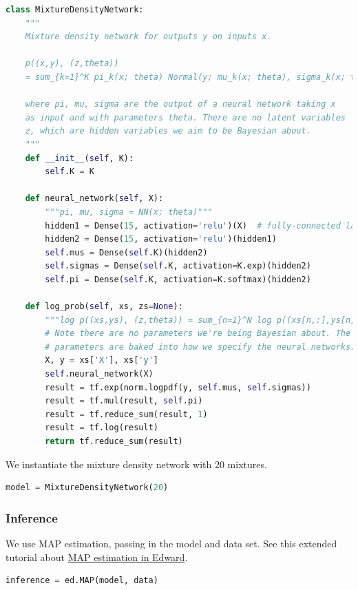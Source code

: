 \begin{lstlisting}[language=Python]
class MixtureDensityNetwork:
    """
    Mixture density network for outputs y on inputs x.

    p((x,y), (z,theta))
    = sum_{k=1}^K pi_k(x; theta) Normal(y; mu_k(x; theta), sigma_k(x; theta))

    where pi, mu, sigma are the output of a neural network taking x
    as input and with parameters theta. There are no latent variables
    z, which are hidden variables we aim to be Bayesian about.
    """
    def __init__(self, K):
        self.K = K

    def neural_network(self, X):
        """pi, mu, sigma = NN(x; theta)"""
        hidden1 = Dense(15, activation='relu')(X)  # fully-connected layer with 15 hidden units
        hidden2 = Dense(15, activation='relu')(hidden1)
        self.mus = Dense(self.K)(hidden2)
        self.sigmas = Dense(self.K, activation=K.exp)(hidden2)
        self.pi = Dense(self.K, activation=K.softmax)(hidden2)

    def log_prob(self, xs, zs=None):
        """log p((xs,ys), (z,theta)) = sum_{n=1}^N log p((xs[n,:],ys[n]), theta)"""
        # Note there are no parameters we're being Bayesian about. The
        # parameters are baked into how we specify the neural networks.
        X, y = xs['X'], xs['y']
        self.neural_network(X)
        result = tf.exp(norm.logpdf(y, self.mus, self.sigmas))
        result = tf.mul(result, self.pi)
        result = tf.reduce_sum(result, 1)
        result = tf.log(result)
        return tf.reduce_sum(result)
\end{lstlisting}

We instantiate the mixture density network with 20 mixtures.

\begin{lstlisting}[language=Python]
model = MixtureDensityNetwork(20)
\end{lstlisting}

\subsubsection{Inference}

We use MAP estimation, passing
in the model and data set.
See this extended tutorial about
\href{tut_MAP}{MAP estimation in Edward}.

\begin{lstlisting}[language=Python]
inference = ed.MAP(model, data)
\end{lstlisting}

